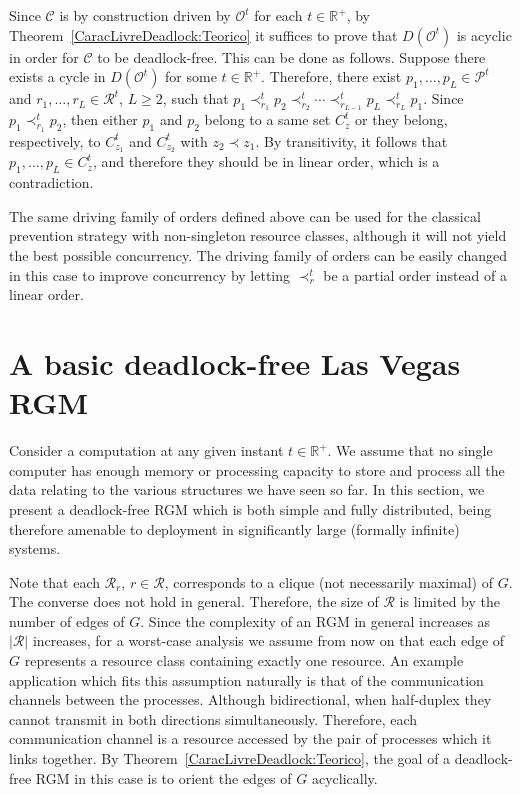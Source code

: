 \documentclass{article}
\newcommand{\Real}{{\mathbb R}}
\newcommand{\R}{\mathcal{R}}
\begin{document}
Since $\mathcal{C}$ is by construction driven by $\mathcal{O}^t$ for each
$t \in \Real^+$, by Theorem~\ref{CaracLivreDeadlock:Teorico} it suffices to
prove that $D(\mathcal{O}^t)$ is acyclic in order for $\mathcal{C}$ to be
deadlock-free. This can be done as follows. Suppose there exists a cycle in
$D(\mathcal{O}^t)$ for some $t \in \Real^+$. Therefore, there exist
$p_1,\ldots,p_L \in \mathcal{P}^t$ and $r_1,\ldots,r_L \in \R^t$, $L \geq 2$,
such that
$p_1 \prec^t_{r_1} p_2 \prec^t_{r_2} \cdots \prec^t_{r_{L-1}} p_L \prec^t_{r_L} p_1$.
Since $p_1 \prec^t_{r_1} p_2$, then either $p_1$ and $p_2$ belong to a same set
$C^t_z$ or they belong, respectively, to $C^t_{z_1}$ and $C^t_{z_2}$ with
$z_2 \prec z_1$. By transitivity, it follows that $p_1, \ldots, p_L \in C^t_z$,
and therefore they should be in linear order, which is a contradiction. 

The same driving family of orders defined above can be used for the classical
prevention strategy with non-singleton resource classes, although it will not
yield the best possible concurrency. The driving family of orders can be easily
changed in this case to improve concurrency by letting $\prec^t_r$ be a partial
order instead of a linear order.

\section{A basic deadlock-free Las Vegas RGM}

Consider a computation at any given instant $t \in \Real^+$. We assume that no
single computer has enough memory or processing capacity to store and process
all the data relating to the various structures we have seen so far. In this
section, we present a deadlock-free RGM which is both simple and fully
distributed, being therefore amenable to deployment in significantly large
(formally infinite) systems. 

Note that each $\R_r$, $r \in \R$, corresponds to a clique (not necessarily
maximal) of $G$. The converse does not hold in general. Therefore, the size of
$\R$ is limited by the number of edges of $G$. Since the complexity of an RGM in
general increases as $|\R|$ increases, for a worst-case analysis we assume from
now on that each edge of $G$ represents a resource class containing exactly one
resource. An example application which fits this assumption naturally is that of
the communication channels between the processes. Although bidirectional, when
half-duplex they cannot transmit in both directions simultaneously. Therefore,
each communication channel is a resource accessed by the pair of processes which
it links together. By Theorem~\ref{CaracLivreDeadlock:Teorico}, the goal of a
deadlock-free RGM in this case is to orient the edges of $G$ acyclically.
\end{document}
